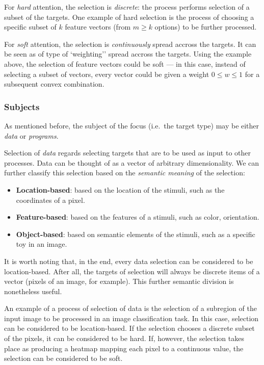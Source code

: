 \documentclass[11pt]{article}
\begin{document}
For \emph{hard} attention, the selection is \emph{discrete}:
the process performs selection of a subset of the targets.
One example of hard selection is the process of
choosing a specific subset of $k$ feature vectors (from $m \ge k$ options)
to be further processed.

For \emph{soft} attention, the selection is \emph{continuously} spread accross the
targets. It can be seen as of type of `weighting'' spread accross the targets.
Using the example above, the selection of feature vectors could be soft ---
in this case, instead of selecting a subset of vectors, every vector
could be given a weight $0 \le w \le 1$ for a subsequent convex combination.

\subsubsection{Subjects}\label{sec:attrs-subjects}
As mentioned before,
the subject of the focus (i.e.\ the target type) may be either \emph{data} or \emph{programs}.

Selection of \emph{data} regards selecting targets that are to be used as input
to other processes.
Data can be thought of as a vector of arbitrary dimensionality.
We can further classify this selection based on the \emph{semantic meaning}
of the selection:
\begin{itemize}
    \item \textbf{Location-based}: based on the location of the stimuli, such as the coordinates of a pixel.
    \item \textbf{Feature-based}: based on the features of a stimuli, such as color, orientation.
    \item \textbf{Object-based}: based on semantic elements of the stimuli, such as a specific toy in an image.
\end{itemize}
It is worth noting that, in the end, every data selection can be considered to be location-based.
After all, the targets of selection will always be discrete items of a vector (pixels of an image, for example).
This further semantic division is nonetheless useful.

An example of a process of selection of data
is the selection of a subregion of the input image to be processed
in an image classification task.
In this case, selection can be considered to be location-based.
If the selection chooses a discrete subset of the pixels, it can be
considered to be hard.
If, however, the selection takes place as producing a
heatmap mapping each pixel to a continuous value, the selection can be
considered to be soft.
\end{document}
